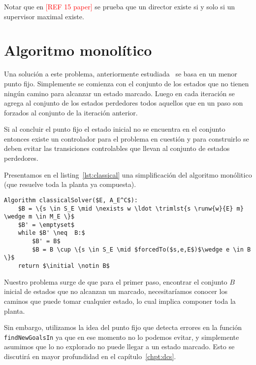 Notar que en \textcolor{red}{[REF 15 paper]} se prueba que un director existe si y solo si un supervisor maximal existe.

\section{Algoritmo monolítico} \label{chpt:algoMono}

Una solución a este problema, anteriormente estudiada~\cite{Ehlers:EECS-2013-162} se basa en un menor punto fijo. Simplemente se comienza con el conjunto de los estados que no tienen ningún camino para alcanzar un estado marcado. Luego en cada iteración se agrega al conjunto de los estados perdedores todos aquellos que en un paso son forzados al conjunto de la iteración anterior. 

Si al concluir el punto fijo el estado inicial no se encuentra en el conjunto entonces existe un controlador para el problema en cuestión y para construirlo se deben evitar las transiciones controlables que llevan al conjunto de estados perdedores.

Presentamos en el listing~\ref{lst:classical} una simplificación del algoritmo monólitico (que resuelve toda la planta ya compuesta).

\begin{lstlisting}[language={pseudocode},label={lst:classical},caption={Algoritmo Monolitico},float=ht]
Algorithm classicalSolver($E, A_E^C$):
	$B = \{s \in S_E \mid \nexists w \ldot \trimlst{s \runw{w}{E} m} \wedge m \in M_E \}$
	$B' = \emptyset$
	while $B' \neq  B:$
		$B' = B$
		$B = B \cup \{s \in S_E \mid $forcedTo($s,e,E$)$\wedge e \in B \}$
	return $\initial \notin B$
\end{lstlisting}

Nuestro problema surge de que para el primer paso, encontrar el conjunto $B$ inicial de estados que no alcanzan un marcado, necesitaríamos conocer los caminos que puede tomar cualquier estado, lo cual implica componer toda la planta.

Sin embargo, utilizamos la idea del punto fijo que detecta errores en la función \texttt{findNewGoalsIn} ya que en ese momento no lo podemos evitar, y simplemente asumimos que lo no explorado no puede llegar a un estado marcado. Esto se discutirá en mayor profundidad en el capítulo~\ref{chpt:dcs}.
